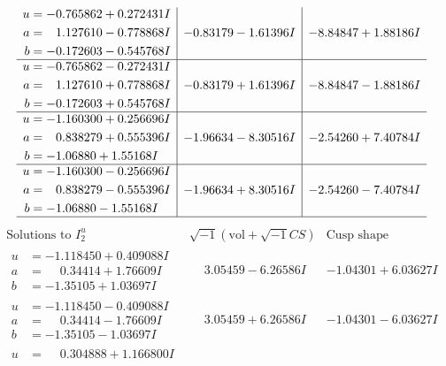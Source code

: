 \documentclass[1p]{elsarticle_modified}
\theoremstyle{definition}
\newcommand{\I}{\sqrt{-1}}
\begin{document}
$$\begin{array}{c|c|c}
\begin{aligned}
u &= -0.765862 + 0.272431 I \\
a &= \phantom{-}1.127610 - 0.778868 I \\
b &= -0.172603 - 0.545768 I\end{aligned}
 & -0.83179 - 1.61396 I & -8.84847 + 1.88186 I \\ \hline\begin{aligned}
u &= -0.765862 - 0.272431 I \\
a &= \phantom{-}1.127610 + 0.778868 I \\
b &= -0.172603 + 0.545768 I\end{aligned}
 & -0.83179 + 1.61396 I & -8.84847 - 1.88186 I \\ \hline\begin{aligned}
u &= -1.160300 + 0.256696 I \\
a &= \phantom{-}0.838279 + 0.555396 I \\
b &= -1.06880 + 1.55168 I\end{aligned}
 & -1.96634 - 8.30516 I & -2.54260 + 7.40784 I \\ \hline\begin{aligned}
u &= -1.160300 - 0.256696 I \\
a &= \phantom{-}0.838279 - 0.555396 I \\
b &= -1.06880 - 1.55168 I\end{aligned}
 & -1.96634 + 8.30516 I & -2.54260 - 7.40784 I\\
 \hline 
 \end{array}$$\newpage$$\begin{array}{c|c|c}  
\text{Solutions to }I^u_{2}& \I (\text{vol} + \sqrt{-1}CS) & \text{Cusp shape}\\
 \hline 
\begin{aligned}
u &= -1.118450 + 0.409088 I \\
a &= \phantom{-}0.34414 + 1.76609 I \\
b &= -1.35105 + 1.03697 I\end{aligned}
 & \phantom{-}3.05459 - 6.26586 I & -1.04301 + 6.03627 I \\ \hline\begin{aligned}
u &= -1.118450 - 0.409088 I \\
a &= \phantom{-}0.34414 - 1.76609 I \\
b &= -1.35105 - 1.03697 I\end{aligned}
 & \phantom{-}3.05459 + 6.26586 I & -1.04301 - 6.03627 I \\ \hline\begin{aligned}
u &= \phantom{-}0.304888 + 1.166800 I \\

\end{aligned}
\end{array}$$
\end{document}
